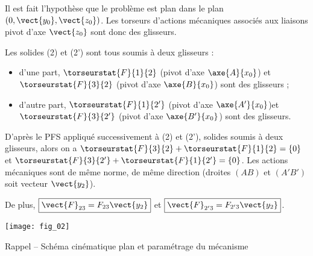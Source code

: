 \ifprof
\begin{corrige}
Il est fait l'hypothèse que le problème est plan dans le plan $\left(0,\vect{y_0},\vect{z_0}\right)$. Les torseurs d'actions mécaniques associés aux liaisons pivot d'axe $\vect{z_0}$ sont donc des glisseurs. 

Les solides (2) et (2') sont tous soumis à deux glisseurs :
\begin{itemize}
\item d'une part, $\torseurstat{F}{1}{2}$ (pivot d'axe $\axe{A}{x_0}$) et $\torseurstat{F}{3}{2}$ (pivot d'axe $\axe{B}{x_0}$) sont des glisseurs ;
\item d'autre part, $\torseurstat{F}{1}{2'}$ (pivot d'axe $\axe{A'}{x_0}$)et $\torseurstat{F}{3}{2'}$  (pivot d'axe $\axe{B'}{x_0}$) sont des glisseurs.
\end{itemize}

D'après le PFS appliqué successivement à (2) et (2'), solides soumis à deux glisseurs, alors on a 
 $\torseurstat{F}{3}{2}+\torseurstat{F}{1}{2}=\{0\}$ et
  $\torseurstat{F}{3}{2'}+\torseurstat{F}{1}{2'}=\{0\}$. Les actions mécaniques sont de même norme, de même direction (droites $(AB)$ et $(A'B')$ soit vecteur $\vect{y_2}$).
  
De plus, $\boxed{\vect{F}_{23}=F_{23}\vect{y_2}}$ et $\boxed{\vect{F}_{2'3}=F_{2'3}\vect{y_2}}$.
\end{corrige}
\else
\fi

\ifprof

\begin{marginfigure}
\texttt{[image: fig\_02]}
\caption{Rappel -- Schéma cinématique plan et paramétrage du mécanisme}
\end{marginfigure}

